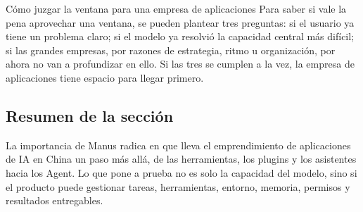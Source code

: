 \begin{importantbox}{Cómo juzgar la ventana para una empresa de aplicaciones}
Para saber si vale la pena aprovechar una ventana, se pueden plantear tres preguntas: si el usuario ya tiene un problema claro; si el modelo ya resolvió la capacidad central más difícil; si las grandes empresas, por razones de estrategia, ritmo u organización, por ahora no van a profundizar en ello. Si las tres se cumplen a la vez, la empresa de aplicaciones tiene espacio para llegar primero.
\end{importantbox}

\subsection{Resumen de la sección}

La importancia de Manus radica en que lleva el emprendimiento de aplicaciones de IA en China un paso más allá, de las herramientas, los plugins y los asistentes hacia los Agent. Lo que pone a prueba no es solo la capacidad del modelo, sino si el producto puede gestionar tareas, herramientas, entorno, memoria, permisos y resultados entregables.

